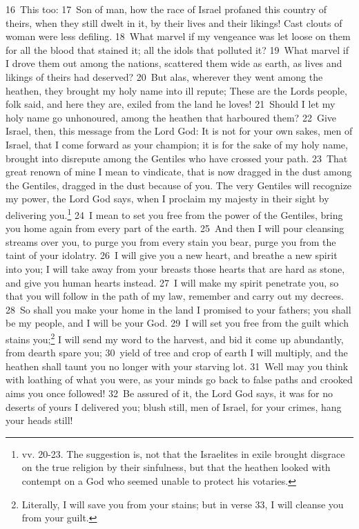 \documentclass[10pt]{book} %
\begin{document}
\textcolor{benred8}{16}~This too: \textcolor{benred8}{17}~Son of man, how the race of Israel profaned this country of theirs, when they still dwelt in it, by their lives and their likings! Cast clouts of woman were less defiling. \textcolor{benred8}{18}~What marvel if my vengeance was let loose on them for all the blood that stained it; all the idols that polluted it? \textcolor{benred8}{19}~What marvel if I drove them out among the nations, scattered them wide as earth, as lives and likings of theirs had deserved? \textcolor{benred8}{20}~But alas, wherever they went among the heathen, they brought my holy name into ill repute; These are the Lord\textquotesingle s people, folk said, and here they are, exiled from the land he loves! \textcolor{benred8}{21}~Should I let my holy name go unhonoured, among the heathen that harboured them?
\textcolor{benred8}{22}~Give Israel, then, this message from the Lord God: It is not for your own sakes, men of Israel, that I come forward as your champion; it is for the sake of my holy name, brought into disrepute among the Gentiles who have crossed your path. \textcolor{benred8}{23}~That great renown of mine I mean to vindicate, that is now dragged in the dust among the Gentiles, dragged in the dust because of you. The very Gentiles will recognize my power, the Lord God says, when I proclaim my majesty in their sight by delivering you.\footnote[2]{vv. 20-23. The suggestion is, not that the Israelites in exile brought disgrace on the true religion by their sinfulness, but that the heathen looked with contempt on a God who seemed unable to protect his votaries.} \textcolor{benred8}{24}~I mean to set you free from the power of the Gentiles, bring you home again from every part of the earth. \textcolor{benred8}{25}~And then I will pour cleansing streams over you, to purge you from every stain you bear, purge you from the taint of your idolatry. \textcolor{benred8}{26}~I will give you a new heart, and breathe a new spirit into you; I will take away from your breasts those hearts that are hard as stone, and give you human hearts instead. \textcolor{benred8}{27}~I will make my spirit penetrate you, so that you will follow in the path of my law, remember and carry out my decrees. \textcolor{benred8}{28}~So shall you make your home in the land I promised to your fathers; you shall be my people, and I will be your God. \textcolor{benred8}{29}~I will set you free from the guilt which stains you;\footnote[3]{Literally, \textasciigrave I will save you from your stains\textquotesingle ; but in verse 33, \textasciigrave I will cleanse you from your guilt\textquotesingle .} I will send my word to the harvest, and bid it come up abundantly, from dearth spare you; \textcolor{benred8}{30}~yield of tree and crop of earth I will multiply, and the heathen shall taunt you no longer with your starving lot. \textcolor{benred8}{31}~Well may you think with loathing of what you were, as your minds go back to false paths and crooked aims you once followed! \textcolor{benred8}{32}~Be assured of it, the Lord God says, it was for no deserts of yours I delivered you; blush still, men of Israel, for your crimes, hang your heads still!
\end{document}
